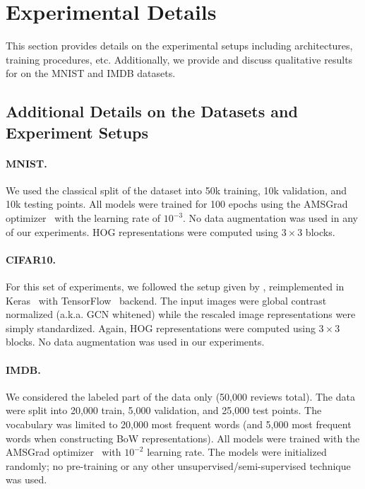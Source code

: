 \documentclass[twoside,11pt]{article}
\begin{document}
\section{Experimental Details}
\label{app:experiments}

This section provides details on the experimental setups including architectures, training procedures, etc.
Additionally, we provide and discuss qualitative results for {\CENs} on the MNIST and IMDB datasets.

\subsection{Additional Details on the Datasets and Experiment Setups}
\label{app:setup-details}

\paragraph{MNIST.}
We used the classical split of the dataset into 50k training, 10k validation, and 10k testing points.
All models were trained for 100 epochs using the AMSGrad optimizer~\citep{reddi2019convergence} with the learning rate of $10^{-3}$.
No data augmentation was used in any of our experiments.
HOG representations were computed using $3 \times 3$ blocks.

\paragraph{CIFAR10.}
For this set of experiments, we followed the setup given by \citet{cifar10blog}, reimplemented in Keras~\citep{chollet2015keras} with TensorFlow~\citep{abadi2016tensorflow} backend.
The input images were global contrast normalized (a.k.a. GCN whitened) while the rescaled image representations were simply standardized.
Again, HOG representations were computed using $3 \times 3$ blocks.
No data augmentation was used in our experiments.

\paragraph{IMDB.}
We considered the labeled part of the data only (50,000 reviews total).
The data were split into 20,000 train, 5,000 validation, and 25,000 test points.
The vocabulary was limited to 20,000 most frequent words (and 5,000 most frequent words when constructing BoW representations).
All models were trained with the AMSGrad optimizer~\citep{} with $10^{-2}$ learning rate.
The models were initialized randomly; no pre-training or any other unsupervised/semi-supervised technique was used.
\end{document}
